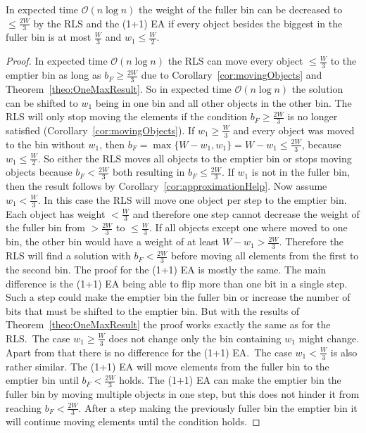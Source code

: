 \begin{lemma}\label{lemma:movingObjects2}
    In expected time $\mathcal{O}(n\log{}n)$ the weight of the fuller bin can be decreased to \(\le \frac{2W}{3}\) by the RLS and the (1+1) EA if every object besides the biggest in the fuller bin is at most $\frac{W}{3}$ and \(w_1 \le \frac{W}{2}\).
\end{lemma}
\begin{proof}
    In expected time $\mathcal{O}(n\log{}n)$ the RLS can move every object $\le \frac{W}{3}$ to the emptier bin as long as $b_F \ge \frac{2W}{3}$ due to Corollary~\ref{cor:movingObjects} and Theorem~\ref{theo:OneMaxResult}.
    So in expected time $\mathcal{O}(n\log{}n)$ the solution can be shifted to $w_1$ being in one bin and all other objects in the other bin.
    The RLS will only stop moving the elements if the condition $b_F \ge \frac{2W}{3}$ is no longer satisfied (Corollary~\ref{cor:movingObjects}).
    If \(w_1 \ge \frac{W}{3}\) and every object was moved to the bin without $w_1$, then \(b_F = \max\{W-w_1, w_1\} = W-w_1 \le \frac{2W}{3}\), because \(w_1 \le \frac{W}{2}\).
    So either the RLS moves all objects to the emptier bin or stops moving objects because $b_F < \frac{2W}{3}$ both resulting in $b_F \le \frac{2W}{3}$.
    If $w_1$ is not in the fuller bin, then the result follows by Corollary~\ref{cor:approximationHelp}.\newline
    Now assume \(w_1 < \frac{W}{3}\).
    In this case the RLS will move one object per step to the emptier bin.
    Each object has weight $< \frac{W}{3}$ and therefore one step cannot decrease the weight of the fuller bin from $> \frac{2W}{3}$ to $\le \frac{W}{3}$.
    If all objects except one where moved to one bin, the other bin would have a weight of at least \(W-w_1 > \frac{2W}{3}\).
    Therefore the RLS will find a solution with $b_F < \frac{2W}{3}$ before moving all elements from the first to the second bin.\newline
    The proof for the (1+1) EA is mostly the same.
    The main difference is the (1+1) EA being able to flip more than one bit in a single step.
    Such a step could make the emptier bin the fuller bin or increase the number of bits that must be shifted to the emptier bin.
    But with the results of Theorem~\ref{theo:OneMaxResult} the proof works exactly the same as for the RLS.\
    The case \(w_1 \ge \frac{W}{3}\) does not change only the bin containing $w_1$ might change.
    Apart from that there is no difference for the (1+1) EA.\
    The case $w_1 < \frac{W}{3}$ is also rather similar.
    The (1+1) EA will move elements from the fuller bin to the emptier bin until $b_F < \frac{2W}{3}$ holds. The (1+1) EA can make the emptier bin the fuller bin by moving multiple objects in one step, but this does not hinder it from reaching $b_F < \frac{2W}{3}$.
    After a step making the previously fuller bin the emptier bin it will continue moving elements until the condition holds.
\end{proof}

